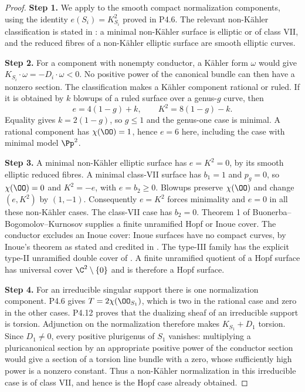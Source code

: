 \begin{proof}
\noindent\textbf{Step 1.} We apply \cite[Chapter~VI, Theorem~1.1 and Table~10, pp.~243--244]{BHPV2004E} to the smooth compact
normalization components, using the identity $e(S_i)=K_{S_i}^2$ proved
in P4.6. The relevant non-Kähler classification is stated in
\cite[Theorem~4.2 and proof, pp.~17--21; Theorem~5.1 and proof, pp.~27--29]{OVV2020}: a minimal non-Kähler
surface is elliptic or of class VII, and the reduced fibres of a
non-Kähler elliptic surface are smooth elliptic curves.

\noindent\textbf{Step 2.} For a component with nonempty conductor, a Kähler form $\omega$ would
give $K_{S_i}\cdot\omega=-D_i\cdot\omega<0$. No positive power of
the canonical bundle can then have a nonzero section. The classification
makes a Kähler component rational or ruled. If it is obtained by $k$
blowups of a ruled surface over a genus-$g$ curve, then
\[
 e=4(1-g)+k,\qquad K^2=8(1-g)-k.
\]
Equality gives $k=2(1-g)$, so $g\le1$ and the genus-one case is minimal.
A rational component has $\chi(\OO)=1$, hence $e=6$ here, including
the case with minimal model $\Pp^2$.

\noindent\textbf{Step 3.} A minimal non-Kähler elliptic surface has $e=K^2=0$, by its smooth
elliptic reduced fibres. A minimal class-VII surface has $b_1=1$ and
$p_g=0$, so $\chi(\OO)=0$ and $K^2=-e$, with $e=b_2\ge0$.
Blowups preserve $\chi(\OO)$ and change $(e,K^2)$ by $(1,-1)$.
Consequently $e=K^2$ forces minimality and $e=0$ in all these
non-Kähler cases. The class-VII case has $b_2=0$. Theorem 1 of
Buonerba--Bogomolov--Kurnosov \cite[Theorem~1, p.~1]{BBK2019} supplies a finite unramified Hopf or
Inoue cover. The conductor excludes an Inoue cover: Inoue surfaces
have no compact curves, by Inoue's theorem as stated and credited in
\cite[Theorem~3.1, p.~303]{KhaledTeleman2026Journal}.
The type-III family has the explicit type-II unramified double cover
of \cite[proof of Remark~3.5, p.~305]{KhaledTeleman2026Journal}. A finite unramified quotient of a Hopf surface has universal
cover $\C^2\setminus\{0\}$ and is therefore a Hopf surface.

\noindent\textbf{Step 4.} For an irreducible singular support there is one normalization
component. P4.6 gives $T=2\chi(\OO_{S_1})$, which is two in the
rational case and zero in the other cases. P4.12 proves that the
dualizing sheaf of an irreducible support is torsion. Adjunction on
the normalization therefore makes $K_{S_1}+D_1$ torsion. Since
$D_1\ne0$, every positive plurigenus of $S_1$ vanishes: multiplying
a pluricanonical section by an appropriate positive power of the
conductor section would give a section of a torsion line bundle with
a zero, whose sufficiently high power is a nonzero constant. Thus a
non-Kähler normalization in this irreducible case is of class VII,
and hence is the Hopf case already obtained.


\end{proof}
